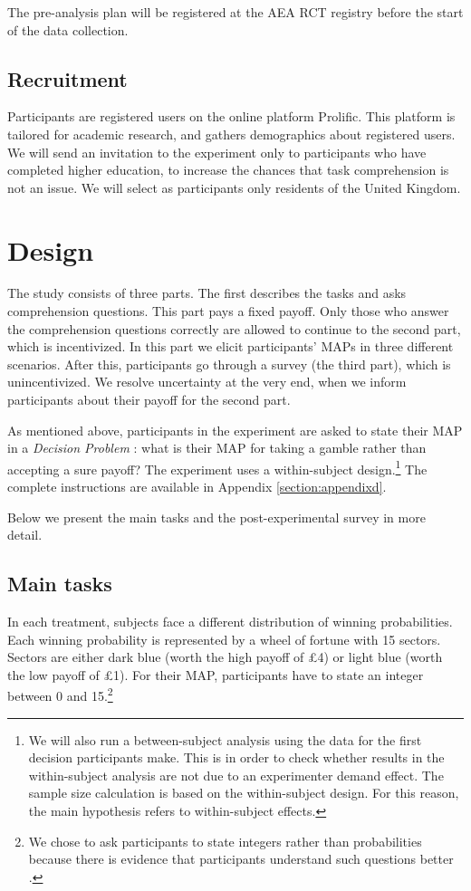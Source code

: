 The pre-analysis plan will be registered at the AEA RCT registry before the start of the data collection.


\subsection{Recruitment}
Participants are registered users on the online platform Prolific.
This platform is tailored for academic research, and gathers demographics about registered users.
We will send an invitation to the experiment only to participants who have completed higher education, to increase the chances that task comprehension is not an issue.
We will select as participants only residents of the United Kingdom.



\section{Design}
The study consists of three parts.
The first describes the tasks and asks comprehension questions.
This part pays a fixed payoff.
Only those who answer the comprehension questions correctly are allowed to continue to the second part, which is incentivized.
In this part we elicit participants' MAPs in three different scenarios.
After this, participants go through a survey (the third part), which is unincentivized.
We resolve uncertainty at the very end, when we inform participants about their payoff for the second part.

As mentioned above, participants in the experiment are asked to state their MAP in a \textit{Decision Problem} \citep{Bohnet2004}: what is their MAP for taking a gamble rather than accepting a sure payoff?
The experiment uses a within-subject design.\footnote{
We will also run a between-subject analysis using the data for the first decision participants make.
This is in order to check whether results in the within-subject analysis are not due to an experimenter demand effect.
The sample size calculation is based on the within-subject design.
For this reason, the main hypothesis refers to within-subject effects.
}
The complete instructions are available in Appendix \ref{section:appendixd}.

Below we present the main tasks and the post-experimental survey in more detail.


\subsection{Main tasks}
In each treatment, subjects face a different distribution of winning probabilities.
Each winning probability is represented by a wheel of fortune with 15 sectors.
Sectors are either dark blue (worth the high payoff of \pounds4) or light blue (worth the low payoff of \pounds1).
For their MAP, participants have to state an integer between 0 and 15.\footnote{
We chose to ask participants to state integers rather than probabilities because there is evidence that participants understand such questions better \citep[for instance, see Study 2 in][]{Quercia2016}.
}

